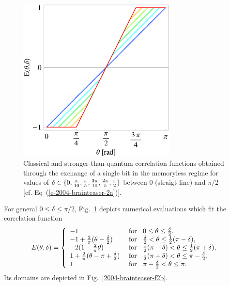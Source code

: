 \documentclass[prl,preprint,amsfonts,showpacs,showkeys]{revtex4}
\begin{document}
\begin{figure}[htbp]
  \centering
  \includegraphics[width=80mm]{2004-brainteaser-f2a}
  \caption{Classical and stronger-than-quantum correlation functions
obtained through the exchange of a single
bit in the memoryless regime for values of $\delta \in \{0,
{\pi \over 10},
{\pi \over 5},
{3\pi \over 10},
{2\pi \over 5},
{\pi \over 2}\}$ between $0$ (straigt line) and $\pi /2$ [cf. Eq~(\ref{e-2004-brainteaser-2a})].}
  \label{2004-brainteaser-f2}
\end{figure}
For general $0\le \delta \le \pi /2$, Fig.~\ref{2004-brainteaser-f2} depicts numerical evaluations
which  fit the correlation function
\begin{equation}
E(\theta ,\delta )= \left\{
\begin{array}{ll}
-1 & \text{ for } \;\; 0\le \theta \le {\delta \over 2} ,  \\
-1 +{2\over \pi}(\theta -{\delta \over 2} )&\text{ for } \;\; {\delta \over 2} < \theta \le {1 \over 2}(\pi - \delta) ,   \\
-2(1-{2 \over \pi } \theta ) &\text{ for } \; \; {1 \over 2}(\pi - \delta) < \theta \le {1 \over 2}(\pi   + \delta ) , \\
1+ {2\over \pi }(\theta-\pi +{\delta \over 2} ) &\text{ for } \;\; {1 \over 2}(\pi   + \delta )  < \theta \le \pi - {\delta \over 2} , \\
1 & \text{ for } \;\; \pi - {\delta \over 2} < \theta \le \pi .
\end{array}        \right.
\label{e-2004-brainteaser-2}
\end{equation}
Its domains are depicted in Fig.~\ref{2004-brainteaser-f2b}.
\end{document}
